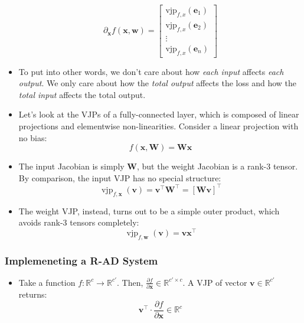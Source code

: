 \documentclass{article}
\newcommand{\mbf}[1]{\mathbf{#1}}
\begin{document}
\begin{itemize}
    \[\partial_\mbf{x}f(\mbf{x}, \mbf{w}) = 
    \begin{bmatrix}
    \text{vjp}_{f,x}(\mathbf{e}_1) \\
    \text{vjp}_{f,x}(\mathbf{e}_2) \\
    \vdots \\
    \text{vjp}_{f,x}(\mathbf{e}_n)
    \end{bmatrix}\]
    \item To put into other words, we don't care about how \emph{each input} affects \emph{each output}. We only care about how the \emph{total output} affects the loss and 
    how the \emph{total input} affects the total output.
    \item Let's look at the VJPs of a fully-connected layer, which is composed of linear projections and elementwise non-linearities. Consider a linear projection with no bias:
    \[f(\mbf{x}, \mbf{W}) = \mbf{Wx}\]
    \item The input Jacobian is simply $\mbf{W}$, but the weight Jacobian is a rank-3 tensor. By comparison, the input VJP has no special structure:
    \[\operatorname{vjp}_{f,\mbf{x}}\mbf{(v)}= \mbf{v}^\top \mbf{W}^\top = \left[ \mbf{Wv} \right] ^\top\]
    \item The weight VJP, instead, turns out to be a simple outer product, which avoids rank-3 tensors completely:
    \[\operatorname{vjp}_{f,\mbf{w}}\mbf{(v)}=\mbf{vx}^\top\]
\end{itemize}
    \subsubsection{Implemeneting a R-AD System}
    \begin{itemize}
        \item Take a function $f : \mathbb{R}^c \rightarrow \mathbb{R}^{c'}$. Then, $\frac{\partial f}{\partial \mbf{x}} \in \mathbb{R}^{c' \times c}$. A VJP of vector $\mbf{v} \in \mathbb{R}^{c'}$ returns:
        \[\mbf{v} ^ \top \cdot \frac{\partial f}{\partial \mbf{x}} \in \mathbb{R}^c\]
    \end{itemize}
\end{document}
